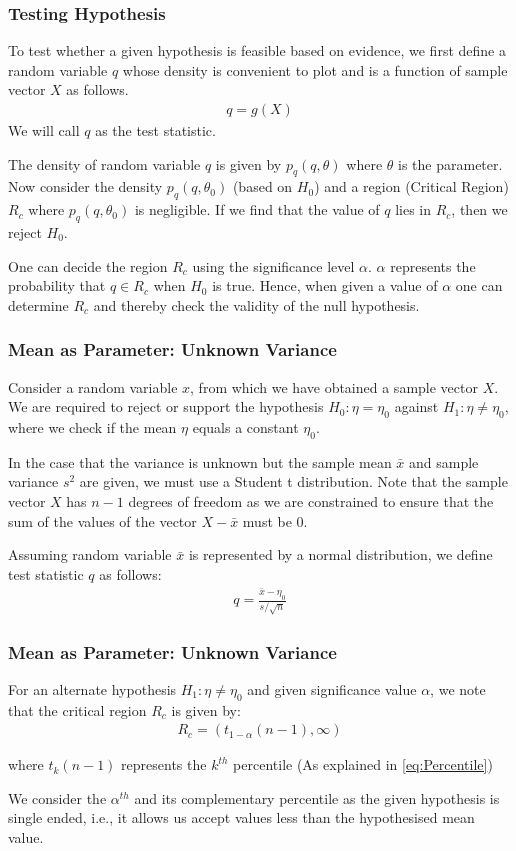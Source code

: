 \documentclass{beamer}
\begin{document}
\begin{frame}
	\frametitle{Testing Hypothesis}
	To test whether a given hypothesis is feasible based on evidence, we first define a random variable $q$ whose density is convenient to plot and is a function of sample vector $X$ as follows.
	\begin{align}
		q = g(X)
		\label{eq:TestStat}
	\end{align}
	We will call $q$ as the test statistic.

	The density of random variable $q$ is given by $p_q(q, \theta)$ where $\theta$ is the parameter. Now consider the density $p_q(q, \theta_0)$ (based on $H_0$) and a region (Critical Region) $R_c$ where $p_q(q, \theta_0)$ is negligible. If we find that the value of $q$ lies in $R_c$, then we reject $H_0$.

	One can decide the region $R_c$ using the significance level $\alpha$. $\alpha$ represents the probability that $q \in R_c$ when $H_0$ is true. Hence, when given a value of $\alpha$ one can determine $R_c$ and thereby check the validity of the null hypothesis. 
\end{frame}

\begin{frame}
	\frametitle{Mean as Parameter: Unknown Variance}
	Consider a random variable $x$, from which we have obtained a sample vector $X$. We are required to reject or support the hypothesis $H_0: \eta = \eta_0$ against $H_1: \eta \neq \eta_0$, where we check if the mean $\eta$ equals a constant $\eta_0$.

	In the case that the variance is unknown but the sample mean $\bar{x}$ and sample variance $s^2$ are given, we must use a Student t distribution. Note that the sample vector $X$ has $n - 1$ degrees of freedom as we are constrained to ensure that the sum of the values of the vector $X - \bar{x}$ must be 0.

	Assuming random variable $\bar{x}$ is represented by a normal distribution, we define test statistic $q$ as follows:
	\begin{align}
		q = \frac{\bar{x} - \eta_0}{s/\sqrt{n}}
		\label{eq:UnknownVar}
	\end{align}
\end{frame}

\begin{frame}
	\frametitle{Mean as Parameter: Unknown Variance}
	For an alternate hypothesis $H_1: \eta \neq \eta_0$ and given significance value $\alpha$, we note that the critical region $R_c$ is given by:
	\begin{align}
		R_c = (t_{1-\alpha}(n - 1), \infty)
		\label{eq:CriticalReg}
	\end{align}

	where $t_k(n - 1)$ represents the $k^{th}$ percentile (As explained in \eqref{eq:Percentile})

	We consider the $\alpha^{th}$ and its complementary percentile as the given hypothesis is single ended, i.e., it allows us accept values less than the hypothesised mean value.

\end{frame}
\end{document}
